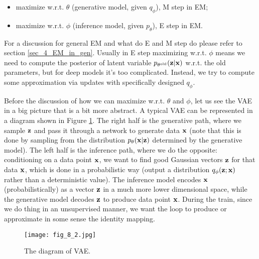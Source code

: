 \documentclass[../main.tex]{subfiles}
\begin{document}
\begin{itemize}
	\item maximize w.r.t. $\theta$ (generative model, given $q_{\phi}$), M step in EM;
	\item maximize w.r.t. $\phi$ (inference model, given $p_\theta$), E step in EM. 
\end{itemize}
For a discussion for general EM and what do E and M step do please refer to section \ref{sec_4_EM_in_gen}. Usually in E step maximizing  w.r.t. $\phi$ means we need to compute the posterior of latent variable $p_{\theta^{\rm old}}({\bf z}|{\bf x})$ w.r.t. the old parameters, but for deep models it's too complicated. Instead, we try to compute some approximation via updates with specifically designed $q_{\phi}$.
\par Before the discussion of how we can maximize w.r.t. $\theta$ and $\phi$, let us see the VAE in a big picture that is a bit more abstract. A typical VAE can be represented in a diagram shown in Figure \ref{fig_8_2}. The right half is the generative path, where we sample ${\bf z}$ and pass it through a network to generate data ${\bf x}$ (note that this is done by sampling from the distribution $p_\theta({\bf x}|{\bf z})$ determined by the generative model). The left half is the inference path, where we do the opposite: conditioning on a data point ${\bf x}$, we want to find good Gaussian vectors ${\bf z}$ for that data ${\bf x}$, which is done in a probabilistic way (output a distribution $q_{\phi}({\bf z};{\bf x})$ rather than a deterministic value). The inference model encodes ${\bf x}$ (probabilistically) as a vector ${\bf z}$ in a much more lower dimensional space, while the generative model decodes ${\bf z}$ to produce data point ${\bf x}$. During the train, since we do thing in an unsupervised manner, we want the loop to produce or approximate in some sense the identity mapping.
\begin{figure}[h] 
	\centering 
	\texttt{[image: fig\_8\_2.jpg]} 
	\caption{The diagram of VAE.}\label{fig_8_2}
\end{figure}
\end{document}
